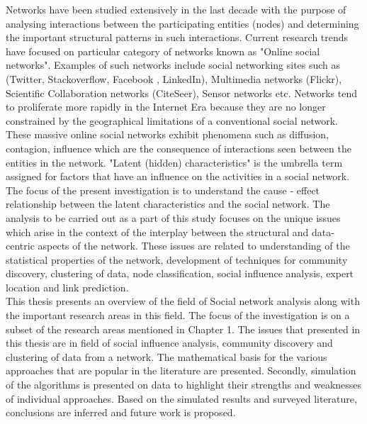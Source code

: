 \begin{abstracts}        


Networks have been studied  extensively  in the last decade with the purpose of  analysing  interactions  between the participating entities (nodes)  and determining the important structural patterns in such interactions.  Current research trends have  focused  on particular category of networks known as "Online
social  networks". Examples of  such networks  include social networking sites such as (Twitter, Stackoverflow, 
Facebook
,
LinkedIn), Multimedia networks (Flickr), Scientific Collaboration networks (CiteSeer), Sensor networks etc.  Networks tend to proliferate more rapidly in the Internet Era because they are no longer constrained by the geographical limitations of a conventional social network. These massive online social networks exhibit phenomena such as diffusion, contagion, influence which are the consequence of interactions seen between the entities in the network. "Latent (hidden) characteristics" is the umbrella term assigned for factors that have an influence on the activities in a social network. The focus of the present investigation is to understand the cause - effect relationship between the latent characteristics and the social network. The analysis to be carried out as a part of this study  focuses  on  the
unique issues which arise in the context of the interplay between the structural
and data-centric aspects of the network. These issues are related to understanding of the statistical properties of the network, development of techniques for community discovery, clustering of data, node classification, social influence analysis, expert location and link prediction. \\

This thesis presents an overview of the field of Social network analysis along with the important research areas in this field. The focus of the investigation is on a subset of the research areas mentioned in Chapter 1. The issues that presented in this thesis are in field of social influence analysis, community discovery and clustering of data from a network. The mathematical basis for the various approaches that are popular in the literature are presented. Secondly, simulation of the algorithms is presented on data to highlight their strengths and weaknesses of individual approaches. Based on the simulated results and surveyed literature, conclusions are inferred and future work is proposed.

\end{abstracts}





